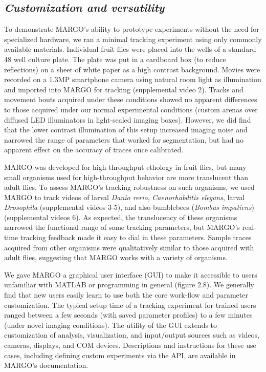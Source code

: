 \documentclass[12pt,letterpaper]{article}
\begin{document}
\subsection*{\textit{Customization and versatility}}

To demonstrate MARGO's ability to prototype experiments without the need for specialized hardware, we ran a minimal tracking experiment using only commonly available materials. Individual fruit flies were placed into the wells of a standard 48 well culture plate. The plate was put in a cardboard box (to reduce reflections) on a sheet of white paper as a high contrast background. Movies were recorded on a 1.3MP smartphone camera using natural room light as illumination and imported into MARGO for tracking (supplemental video 2). Tracks and movement bouts acquired under these conditions showed no apparent differences to those acquired under our normal experimental conditions (custom arenas over diffused LED illuminators in light-sealed imaging boxes). However, we did find that the lower contrast illumination of this setup increased imaging noise and narrowed the range of parameters that worked for segmentation, but had no apparent effect on the accuracy of traces once calibrated.

MARGO was developed for high-throughput ethology in fruit flies, but many small organisms used for high-throughput behavior are more translucent than adult flies. To assess MARGO’s tracking robustness on such organisms, we used MARGO to track videos of larval \emph{Danio rerio}, \emph{Caenorhabditis elegans}, larval \emph{Drosophila} (supplemental videos 3-5), and also bumblebees (\emph{Bombus impatiens}) (supplemental videos 6). As expected, the translucency of these organisms narrowed the functional range of some tracking parameters, but MARGO's real-time tracking feedback made it easy to dial in these parameters. Sample traces acquired from other organisms were qualitatively similar to those acquired with adult flies, suggesting that MARGO works with a variety of organisms.

We gave MARGO a graphical user interface (GUI) to make it accessible to users unfamiliar with MATLAB or programming in general (figure 2.8). We generally find that new users easily learn to use both the core work-flow and parameter customization. The typical setup time of a tracking experiment for trained users ranged between a few seconds (with saved parameter profiles) to a few minutes (under novel imaging conditions). The utility of the GUI extends to customization of analysis, visualization, and input/output sources such as videos, cameras, displays, and COM devices. Descriptions and instructions for these use cases, including defining custom experiments via the API, are available in MARGO's documentation.
\end{document}
